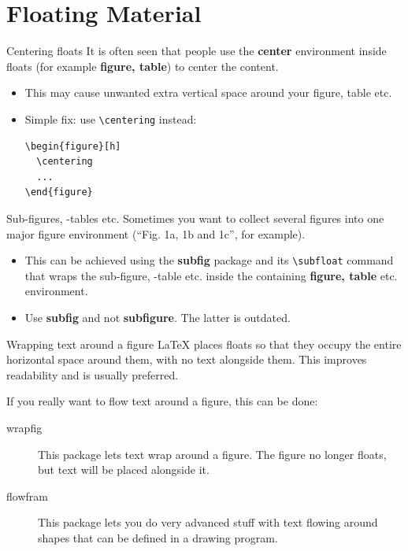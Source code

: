 \documentclass[english]{beamer}
\begin{document}

\section{Floating Material}


\begin{frame}[fragile]{\insertsection}{Centering floats}
  It is often seen that people use the \textbf{center} environment
  inside floats (for example \textbf{figure, table}) to center the
  content.
  \begin{itemize}
  \item This may cause unwanted extra vertical space around your
    figure, table etc.
  \item Simple fix: use \verb|\centering| instead:
\begin{verbatim}
\begin{figure}[h]
  \centering
  ...
\end{figure}
\end{verbatim}
  \end{itemize}
\end{frame}


\begin{frame}[fragile]{\insertsection}{Sub-figures, -tables etc.}
  Sometimes you want to collect several figures into one major figure
  environment (``Fig. 1a, 1b and 1c'', for example).
  \begin{itemize}
  \item This can be achieved using the \textbf{subfig} package and its
    \verb|\subfloat| command that wraps the sub-figure, -table
    etc. inside the containing \textbf{figure, table}
    etc. environment.
  \item Use \textbf{subfig} and not \textbf{subfigure}. The latter is
    outdated.
  \end{itemize}
\end{frame}


\begin{frame}{\insertsection}{Wrapping text around a figure}
  \LaTeX{} places floats so that they occupy the entire horizontal
  space around them, with no text alongside them. This improves
  readability and is usually preferred.

  If you really want to flow text around a figure, this can be done:
  \begin{description}
  \item[wrapfig] This package lets text wrap around a figure. The
    figure no longer floats, but text will be placed alongside it.
  \item[flowfram] This package lets you do very advanced stuff with
    text flowing around shapes that can be defined in a drawing
    program.
  \end{description}
\end{frame}
\end{document}
